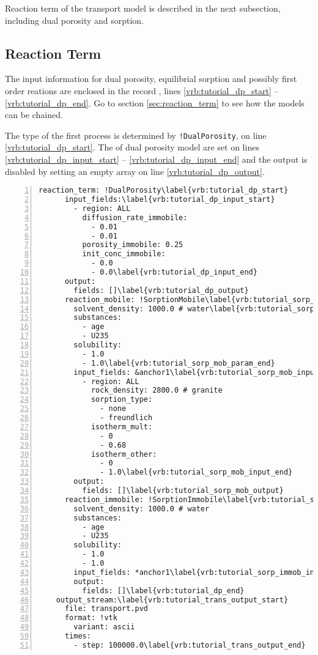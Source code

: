 Reaction term of the transport model is described in the next subsection, including dual porosity and sorption.

\subsection{Reaction Term}\label{subsubsec:reactions}
The input information for dual porosity, equilibrial sorption and possibly first order reations are enclosed in the record 
, lines \ref{vrb:tutorial_dp_start} -- \ref{vrb:tutorial_dp_end}. Go to section \ref{sec:reaction_term}
to see how the models can be chained.

The type of the first process is determined by {\tt !DualPorosity}, on line \ref{vrb:tutorial_dp_start}. 
The 
of dual porosity model are set on lines \ref{vrb:tutorial_dp_input_start} -- \ref{vrb:tutorial_dp_input_end} and the output is disabled by setting an empty array on line \ref{vrb:tutorial_dp_output}.

\begin{Verbatim}[numbers=left, firstnumber=last,commandchars=\\\{\}]
    reaction_term: !DualPorosity\label{vrb:tutorial_dp_start}
      input_fields:\label{vrb:tutorial_dp_input_start}
        - region: ALL
          diffusion_rate_immobile:
            - 0.01
            - 0.01
          porosity_immobile: 0.25
          init_conc_immobile:
            - 0.0
            - 0.0\label{vrb:tutorial_dp_input_end}
      output:
        fields: []\label{vrb:tutorial_dp_output}
      reaction_mobile: !SorptionMobile\label{vrb:tutorial_sorp_mob}
        solvent_density: 1000.0 # water\label{vrb:tutorial_sorp_mob_param_start}
        substances:
          - age
          - U235
        solubility:
          - 1.0
          - 1.0\label{vrb:tutorial_sorp_mob_param_end}
        input_fields: &anchor1\label{vrb:tutorial_sorp_mob_input_start}
          - region: ALL
            rock_density: 2800.0 # granite
            sorption_type:
              - none
              - freundlich
            isotherm_mult:
              - 0
              - 0.68
            isotherm_other:
              - 0
              - 1.0\label{vrb:tutorial_sorp_mob_input_end}
        output:
          fields: []\label{vrb:tutorial_sorp_mob_output}
      reaction_immobile: !SorptionImmobile\label{vrb:tutorial_sorp_immob}
        solvent_density: 1000.0 # water
        substances:
          - age
          - U235
        solubility:
          - 1.0
          - 1.0
        input_fields: *anchor1\label{vrb:tutorial_sorp_immob_input}
        output:
          fields: []\label{vrb:tutorial_dp_end}
    output_stream:\label{vrb:tutorial_trans_output_start}
      file: transport.pvd
      format: !vtk
        variant: ascii
      times:
        - step: 100000.0\label{vrb:tutorial_trans_output_end}
\end{Verbatim}

